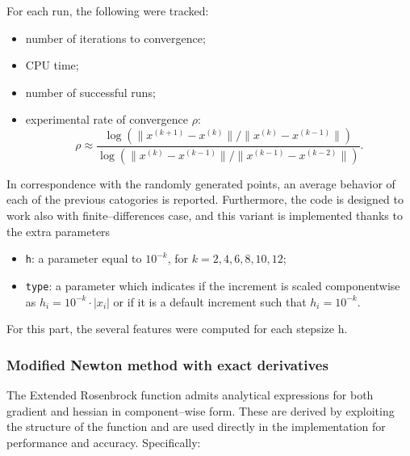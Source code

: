 \documentclass[a4paper,12pt]{article}
\begin{document}
	\vspace{0.5cm}
	For each run, the following were tracked:
	\begin{itemize}
		\item number of iterations to convergence;
		\item CPU time;
		\item number of successful runs;
		\item experimental rate of convergence \(\rho\):
		\[
		\rho \approx \frac{\log\left(\|x^{(k+1)} - x^{(k)}\|\big/\|x^{(k)} - x^{(k-1)}\|\right)}{\log\left(\|x^{(k)} - x^{(k-1)}\|\big/\|x^{(k-1)} - x^{(k-2)}\|\right)}.
		\]
		\end{itemize}
	In correspondence with the randomly generated points, an average behavior of each of the previous catogories is reported. Furthermore, the code is designed to work also with finite--differences case,  and this variant is implemented thanks to the extra parameters 
	\begin{itemize}
		\item \texttt{h}: a parameter equal to \(10^{-k} \), for \( k = 2, 4, 6, 8, 10, 12 \);
		\item \texttt{type}: a parameter which indicates if the increment is scaled componentwise as \( h_i = 10^{-k} \cdot |x_i| \) or if it is a default increment such that \( h_i = 10^{-k}\). 
	\end{itemize}
	
	\noindent For this part, the several features were computed for each stepsize h.
	
	\subsubsection{Modified Newton method with exact derivatives}
		
	The Extended Rosenbrock function admits analytical expressions for both gradient and hessian in component--wise form. These are derived by exploiting the structure of the function and are used directly in the implementation for performance and accuracy. Specifically:
	
\end{document}
